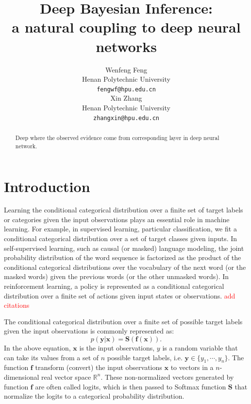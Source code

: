 \documentclass{article}
\title{
  Deep Bayesian Inference: \\ a natural coupling to deep neural networks
}
\author{%
  Wenfeng Feng\\
  Henan Polytechnic University\\
  \texttt{fengwf@hpu.edu.cn} \\
  \And
  Xin Zhang\\
  Henan Polytechnic University\\
  \texttt{zhangxin@hpu.edu.cn} \\
}
\begin{document}
\maketitle


\begin{abstract}
  Deep
  where the observed evidence come from corresponding layer in deep neural network.
\end{abstract}


\section{Introduction}

Learning the conditional categorical distribution over a finite set of target labels or categories given the input observations plays an essential role in machine learning.
For example, in supervised learning, particular classification, we fit a conditional categorical distribution over a set of target classes given inputs. %
In self-supervised learning, such as causal (or masked) language modeling, the joint probability distribution of the word sequence is factorized as the product of the conditional categorical distributions over the vocabulary of the next word (or the masked words) given the previous words (or the other unmasked words).
In reinforcement learning, a policy is represented as a conditional categorical distribution over a finite set of actions given input states or observations.
\textcolor{red}{add citations}


The conditional categorical distribution over a finite set of possible target labels given the input observations is commonly represented as:
\begin{equation}
  p(\bm{y}|\bm{x}) = \bm{S}(\bm{f}(\bm{x})).
\end{equation}
In the above equation, $\bm{x}$ is the input observations, $y$ is a random variable that can take its values from a set of $n$ possible target labels, i.e. $\bm{y} \in \{y_1, \cdots, y_n\}$.
The function $\bm{f}$ transform (convert) the input observations $\bm{x}$ to vectors in a $n$-dimensional real vector space $\mathbb{R}^n$.
These non-normalized vectors generated by function $\bm{f}$ are often called logits, which is then passed to Softmax function $\bm{S}$ that normalize the logits to a categorical probability distribution.
\end{document}
